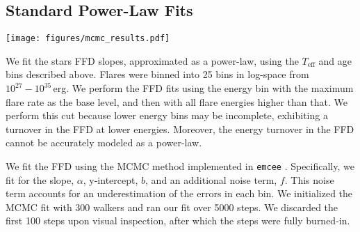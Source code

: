 \documentclass[twocolumn]{aastex631}
\begin{document}
\subsection{Standard Power-Law Fits}\label{subsec:energy_ffd}

\begin{figure*}[bht!]
    \begin{centering}
        \texttt{[image: figures/mcmc\_results.pdf]}
        \caption{
            Measured flare-frequency distribution slopes, $\alpha$, as a function of stellar effective temperature, $T_\textrm{eff}$ and age. We measured these FFDs with respect to flare energy. We find the FFD slopes as a function of energy are consistent with $\alpha = -0.6 ~\textrm{to} -0.2$ for stars $< 300$~Myr in TESS observations. A shallower FFD slope is indicative of more high-energy flares. We present all measured FFDs in Figure~\ref{appendix:supp_ffds}, and all measured slopes and errors in Table~\ref{tab:best_fits}. We find the shallowest slopes for stars $T_\textrm{eff} = 3400 - 4440$\,K, with a range from $\alpha = -0.44~ \textrm{to} -0.22$. We do not include the results for stars $T_\textrm{eff} = 3850 - 4440$\,K and $t_\textrm{age} = 20 - 40$\,Myr as this bin contained only six stars with detected flares. We present the average results of measured FFD slopes for the Hyades, Pleiades, and Praesepe clusters from \cite{ilin21} as black squares. We present the results of measured FFD slopes for all TESS primary mission targets in white circles \citep{Feinstein22}. We present these data as ``field-age". We discuss what drives the difference between our sample and \cite{ilin21} in Section~\ref{subsec:energy_ffd}.
        }
        \label{fig:mcmc_results}
    \end{centering}
\end{figure*}

We fit the stars FFD slopes, approximated as a power-law, using the $T_\textrm{eff}$ and age bins described above. Flares were binned into 25 bins in log-space from $10^{27} - 10^{35}$\,erg. We perform the FFD  fits using the energy bin with the maximum flare rate as the base level, and then with all flare energies higher than that. We perform this cut  because lower energy bins may be incomplete, exhibiting a turnover in the FFD at lower energies. Moreover, the energy turnover in the FFD cannot be accurately modeled as a power-law.

We fit the FFD using the MCMC method implemented in \texttt{emcee} \citep{goodman10, emcee}. Specifically, we fit for the slope, $\alpha$, y-intercept, $b$, and an additional noise term, $f$. This noise term  accounts for an underestimation of the errors in each bin. We initialized the MCMC fit with 300 walkers and ran our fit over 5000 steps.  We discarded the first 100 steps upon visual inspection, after which the steps were fully burned-in.
\end{document}
